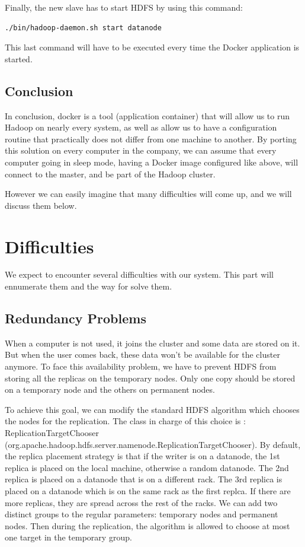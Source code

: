 \documentclass[11pt]{report} %
\begin{document}
Finally, the new slave has to start HDFS by using this command:
\begin{lstlisting}[language=bash]
./bin/hadoop-daemon.sh start datanode
\end{lstlisting}
This last command will have to be executed every time the Docker application is started.

\section{Conclusion}
In conclusion, docker is a tool (application container) that will allow us to run Hadoop on nearly every system, as well as allow us to have a configuration routine that practically does not differ from one machine to another. By porting this solution on every computer in the company, we can assume that every computer going in sleep mode, having a Docker image configured like above, will connect to the master, and be part of the Hadoop cluster.

However we can easily imagine that many difficulties will come up, and we will discuss them below.

\chapter{Difficulties}

We expect to encounter several difficulties with our system. This part will ennumerate them and the way for solve them.

\section{Redundancy Problems}
When a computer is not used, it joins the cluster and some data are stored on it. But when the user comes back, these data won't be available for the cluster anymore. To face this availability problem, we have to prevent HDFS from storing all the replicas on the temporary nodes. Only one copy should be stored on a temporary node and the others on permanent nodes.

To achieve this goal, we can modify the standard HDFS algorithm which chooses the nodes for the replication. The class in charge of this choice is : ReplicationTargetChooser (org.apache.hadoop.hdfs.server.namenode.ReplicationTargetChooser). By default, the replica placement strategy is that if the writer is on a datanode, the 1st replica is placed on the local machine, otherwise a random datanode. The 2nd replica is placed on a datanode that is on a different rack. The 3rd replica is placed on a datanode which is on the same rack as the first replca. If there are more replicas, they are spread across the rest of the racks.
We can add two distinct groups to the regular parameters: temporary nodes and permanent nodes. Then during the replication, the algorithm is allowed to choose at most one target in the temporary group.
\end{document}
